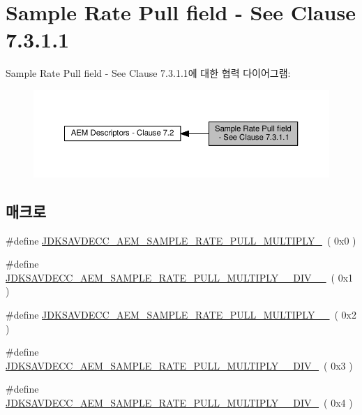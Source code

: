 \hypertarget{group__pull}{}\section{Sample Rate Pull field -\/ See Clause 7.3.1.1}
\label{group__pull}
Sample Rate Pull field -\/ See Clause 7.3.1.1에 대한 협력 다이어그램\+:
\nopagebreak
\begin{figure}[H]
\begin{center}
\leavevmode
\includegraphics[width=350pt]{group__pull}
\end{center}
\end{figure}
\subsection*{매크로}
\begin{DoxyCompactItemize}
\item 
\#define \hyperlink{group__pull_ga5ad421b0334564fd5ab30e2f4d005024}{J\+D\+K\+S\+A\+V\+D\+E\+C\+C\+\_\+\+A\+E\+M\+\_\+\+S\+A\+M\+P\+L\+E\+\_\+\+R\+A\+T\+E\+\_\+\+P\+U\+L\+L\+\_\+\+M\+U\+L\+T\+I\+P\+L\+Y\+\_}~( 0x0 )
\item 
\#define \hyperlink{group__pull_ga5d5f0fd74d619b0299e9eadb91577cca}{J\+D\+K\+S\+A\+V\+D\+E\+C\+C\+\_\+\+A\+E\+M\+\_\+\+S\+A\+M\+P\+L\+E\+\_\+\+R\+A\+T\+E\+\_\+\+P\+U\+L\+L\+\_\+\+M\+U\+L\+T\+I\+P\+L\+Y\+\_\+\_\+\+D\+I\+V\+\_\+\_}~( 0x1 )
\item 
\#define \hyperlink{group__pull_ga2010fbb6c93ca7e016817766eaf2ba6f}{J\+D\+K\+S\+A\+V\+D\+E\+C\+C\+\_\+\+A\+E\+M\+\_\+\+S\+A\+M\+P\+L\+E\+\_\+\+R\+A\+T\+E\+\_\+\+P\+U\+L\+L\+\_\+\+M\+U\+L\+T\+I\+P\+L\+Y\+\_\+\_}~( 0x2 )
\item 
\#define \hyperlink{group__pull_gafe648e87c554e589d64260c903275768}{J\+D\+K\+S\+A\+V\+D\+E\+C\+C\+\_\+\+A\+E\+M\+\_\+\+S\+A\+M\+P\+L\+E\+\_\+\+R\+A\+T\+E\+\_\+\+P\+U\+L\+L\+\_\+\+M\+U\+L\+T\+I\+P\+L\+Y\+\_\+\_\+\+D\+I\+V\+\_}~( 0x3 )
\item 
\#define \hyperlink{group__pull_gad0aef42fa532972fa8571d9943d10e4b}{J\+D\+K\+S\+A\+V\+D\+E\+C\+C\+\_\+\+A\+E\+M\+\_\+\+S\+A\+M\+P\+L\+E\+\_\+\+R\+A\+T\+E\+\_\+\+P\+U\+L\+L\+\_\+\+M\+U\+L\+T\+I\+P\+L\+Y\+\_\+\_\+\+D\+I\+V\+\_}~( 0x4 )
\end{DoxyCompactItemize}



